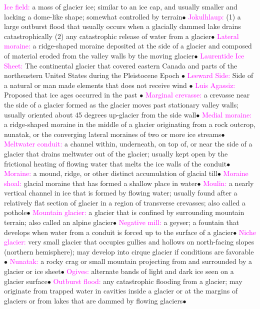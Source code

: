\documentclass{article}
\newcommand{\ddd}{$\bullet$}
\newcommand{\pink}[1]{\textcolor{magenta}{#1}}
\newcommand{\vocab}[1]{{\pink{#1}}}
\begin{document}
\begin{multicols*}{4}
		\vocab{        Ice field: } a mass of glacier ice; similar to an ice cap, and usually smaller and lacking a dome-like shape; somewhat controlled by terrain\ddd
		\vocab{        Jokulhlaup: } (1) a large outburst flood that usually occurs when a glacially dammed lake drains catastrophically (2) any catastrophic release of water from a glacier\ddd
		\vocab{        Lateral moraine: } a ridge-shaped moraine deposited at the side of a glacier and composed of material eroded from the valley walls by the moving glacier\ddd
		\vocab{Laurentide Ice Sheet: }The continental glacier that covered eastern Canada and parts of the northeastern United States during the Pleistocene Epoch \ddd
		\vocab{Leeward Side: }Side of a natural or man made elements that does not receive wind \ddd
		\vocab{Luis Agassiz: } Proposed that ice ages occurred in the past  \ddd
		\vocab{        Marginal crevasse: } a crevasse near the side of a glacier formed as the glacier moves past stationary valley walls; usually oriented about 45 degrees up-glacier from the side wall\ddd
		\vocab{        Medial moraine: } a ridge-shaped moraine in the middle of a glacier originating from a rock outcrop, nunatak, or the converging lateral moraines of two or more ice streams\ddd
		\vocab{        Meltwater conduit: } a channel within, underneath, on top of, or near the side of a glacier that drains meltwater out of the glacier; usually kept open by the frictional heating of flowing water that melts the ice walls of the conduit\ddd
		\vocab{        Moraine: } a mound, ridge, or other distinct accumulation of glacial till\ddd
		\vocab{        Moraine shoal: } glacial moraine that has formed a shallow place in water\ddd
		\vocab{        Moulin: } a nearly vertical channel in ice that is formed by flowing water; usually found after a relatively flat section of glacier in a region of transverse crevasses; also called a pothole\ddd
		\vocab{        Mountain glacier: } a glacier that is confined by surrounding mountain terrain; also called an alpine glacier\ddd
		\vocab{        Negative mill: } a geyser; a fountain that develops when water from a conduit is forced up to the surface of a glacier\ddd
		\vocab{        Niche glacier: } very small glacier that occupies gullies and hollows on north-facing slopes (northern hemisphere); may develop into cirque glacier if conditions are favorable\ddd
		\vocab{        Nunatak: } a rocky crag or small mountain projecting from and surrounded by a glacier or ice sheet\ddd
		\vocab{        Ogives: } alternate bands of light and dark ice seen on a glacier surface\ddd
		\vocab{        Outburst flood: } any catastrophic flooding from a glacier; may originate from trapped water in cavities inside a glacier or at the margins of glaciers or from lakes that are dammed by flowing glaciers\ddd

\end{multicols*}
\end{document}
